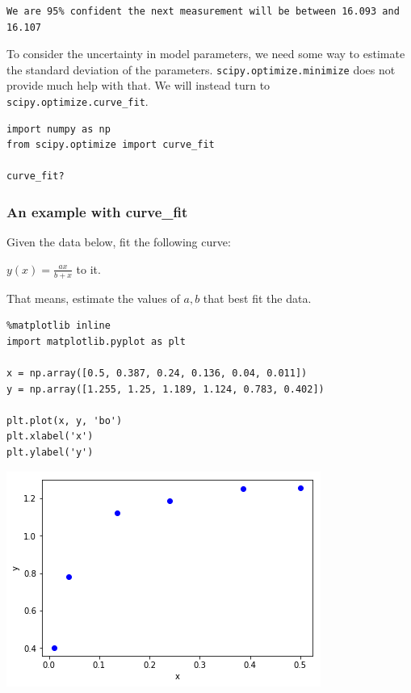 \documentclass[11pt]{article}
\begin{document}
\begin{verbatim}
We are 95% confident the next measurement will be between 16.093 and 16.107

\end{verbatim}

To consider the uncertainty in model parameters, we need some way to estimate the standard deviation of the parameters. \texttt{scipy.optimize.minimize} does not provide much help with that. We will instead turn to \texttt{scipy.optimize.curve\_fit}.

\begin{verbatim}
import numpy as np
from scipy.optimize import curve_fit

curve_fit?
\end{verbatim}

\subsubsection{An example with curve\_fit}
\label{sec:org786168c}

Given the data below, fit the following curve:

\(y(x) = \frac{a x}{b + x}\) to it.

That means, estimate the values of \(a, b\) that best fit the data.

\begin{verbatim}
%matplotlib inline
import matplotlib.pyplot as plt

x = np.array([0.5, 0.387, 0.24, 0.136, 0.04, 0.011])
y = np.array([1.255, 1.25, 1.189, 1.124, 0.783, 0.402])

plt.plot(x, y, 'bo')
plt.xlabel('x')
plt.ylabel('y')
\end{verbatim}

\begin{center}
\includegraphics[width=.9\linewidth]{obipy-resources/513154bd4a2746455cb8d249e9b62785-92704lhH.png}
\end{center}
\end{document}
